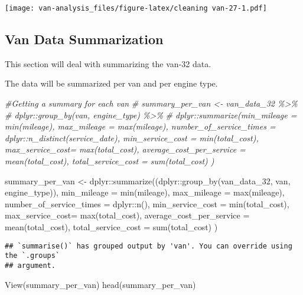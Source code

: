 \documentclass[
]{article}
\newenvironment{Shaded}{\begin{snugshade}}{\end{snugshade}}
\newcommand{\AttributeTok}[1]{\textcolor[rgb]{0.77,0.63,0.00}{#1}}
\newcommand{\CommentTok}[1]{\textcolor[rgb]{0.56,0.35,0.01}{\textit{#1}}}
\newcommand{\FunctionTok}[1]{\textcolor[rgb]{0.00,0.00,0.00}{#1}}
\newcommand{\NormalTok}[1]{#1}
\newcommand{\OtherTok}[1]{\textcolor[rgb]{0.56,0.35,0.01}{#1}}
\newcommand{\SpecialCharTok}[1]{\textcolor[rgb]{0.00,0.00,0.00}{#1}}
\begin{document}
\texttt{[image: van-analysis\_files/figure-latex/cleaning van-27-1.pdf]}

\hypertarget{van-data-summarization}{%
\subsection{Van Data Summarization}\label{van-data-summarization}}

This section will deal with summarizing the van-32 data.

The data will be summarized per van and per engine type.

\begin{Shaded}
\begin{Highlighting}[]
\CommentTok{\#Getting a summary for each van}
\CommentTok{\# summary\_per\_van \textless{}{-} van\_data\_32 \%\textgreater{}\%}
\CommentTok{\#   dplyr::group\_by(van, engine\_type) \%\textgreater{}\%}
\CommentTok{\#   dplyr::summarize(min\_mileage = min(mileage), max\_mileage = max(mileage),  number\_of\_service\_times = dplyr::n\_distinct(service\_date), min\_service\_cost = min(total\_cost), max\_service\_cost= max(total\_cost), average\_cost\_per\_service = mean(total\_cost), total\_service\_cost = sum(total\_cost) )}


\NormalTok{summary\_per\_van }\OtherTok{\textless{}{-}}\NormalTok{ dplyr}\SpecialCharTok{::}\FunctionTok{summarize}\NormalTok{((dplyr}\SpecialCharTok{::}\FunctionTok{group\_by}\NormalTok{(van\_data\_32, van, engine\_type)), }\AttributeTok{min\_mileage =} \FunctionTok{min}\NormalTok{(mileage), }\AttributeTok{max\_mileage =} \FunctionTok{max}\NormalTok{(mileage),  }\AttributeTok{number\_of\_service\_times =}\NormalTok{ dplyr}\SpecialCharTok{::}\FunctionTok{n}\NormalTok{(), }\AttributeTok{min\_service\_cost =} \FunctionTok{min}\NormalTok{(total\_cost), }\AttributeTok{max\_service\_cost=} \FunctionTok{max}\NormalTok{(total\_cost), }\AttributeTok{average\_cost\_per\_service =} \FunctionTok{mean}\NormalTok{(total\_cost), }\AttributeTok{total\_service\_cost =} \FunctionTok{sum}\NormalTok{(total\_cost) )}
\end{Highlighting}
\end{Shaded}

\begin{verbatim}
## `summarise()` has grouped output by 'van'. You can override using the `.groups`
## argument.
\end{verbatim}

\begin{Shaded}
\begin{Highlighting}[]
\FunctionTok{View}\NormalTok{(summary\_per\_van)}
\FunctionTok{head}\NormalTok{(summary\_per\_van)}
\end{Highlighting}
\end{Shaded}
\end{document}

